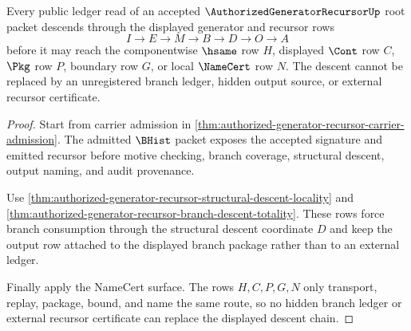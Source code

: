 \begin{theorem}
\label{thm:authorized-generator-recursor-ledger-descent}
Every public ledger read of an accepted $\AuthorizedGeneratorRecursorUp$ root packet descends through the displayed generator and recursor rows
$$
I \to E \to M \to B \to D \to O \to A
$$
before it may reach the componentwise $\hsame$ row $H$, displayed $\Cont$ row $C$, $\Pkg$ row $P$, boundary row $G$, or local $\NameCert$ row $N$. The descent cannot be replaced by an unregistered branch ledger, hidden output source, or external recursor certificate.
\end{theorem}
\begin{proof}
Start from carrier admission in \autoref{thm:authorized-generator-recursor-carrier-admission}. The admitted $\BHist$ packet exposes the accepted signature and emitted recursor before motive checking, branch coverage, structural descent, output naming, and audit provenance.

Use \autoref{thm:authorized-generator-recursor-structural-descent-locality} and \autoref{thm:authorized-generator-recursor-branch-descent-totality}. These rows force branch consumption through the structural descent coordinate $D$ and keep the output row attached to the displayed branch package rather than to an external ledger.

Finally apply the NameCert surface. The rows $H,C,P,G,N$ only transport, replay, package, bound, and name the same route, so no hidden branch ledger or external recursor certificate can replace the displayed descent chain.
\end{proof}

